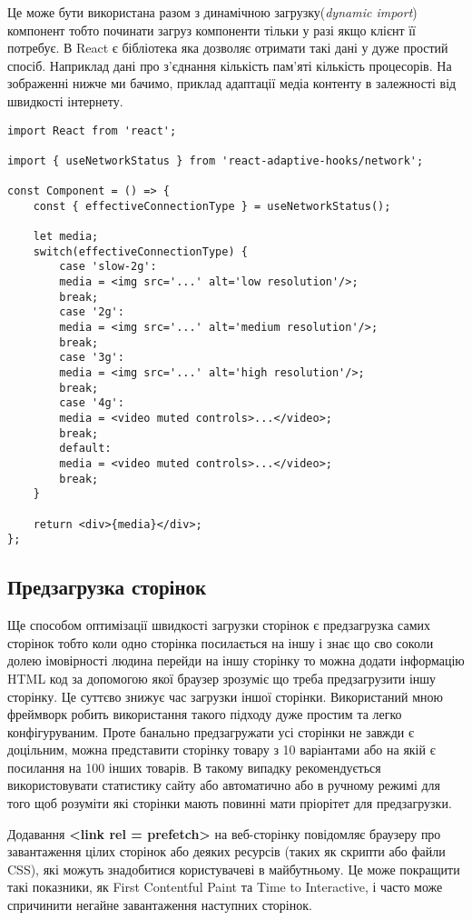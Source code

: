 Це може бути використана разом з динамічною загрузку(\textit{dynamic import}) компонент тобто починати загруз компоненти тільки у разі якщо клієнт її потребує.
В React є бібліотека яка дозволяє отримати такі дані у дуже простий спосіб.
Наприклад дані про з'єднання кількість пам'яті кількість процесорів.
На зображенні нижче ми бачимо, приклад адаптації медіа контенту в залежності від швидкості інтернету.
\begin{lstlisting}[basicstyle=\small]
import React from 'react';

import { useNetworkStatus } from 'react-adaptive-hooks/network';

const Component = () => {
    const { effectiveConnectionType } = useNetworkStatus();

    let media;
    switch(effectiveConnectionType) {
        case 'slow-2g':
        media = <img src='...' alt='low resolution'/>;
        break;
        case '2g':
        media = <img src='...' alt='medium resolution'/>;
        break;
        case '3g':
        media = <img src='...' alt='high resolution'/>;
        break;
        case '4g':
        media = <video muted controls>...</video>;
        break;
        default:
        media = <video muted controls>...</video>;
        break;
    }

    return <div>{media}</div>;
};

\end{lstlisting}
\subsection{Предзагрузка сторінок}
Ще способом оптимізації швидкості загрузки сторінок є предзагрузка самих сторінок тобто коли одно сторінка посилається на іншу
і знає що сво соколи долею імовірності людина перейди на іншу сторінку то можна додати інформацію HTML код за допомогою якої
браузер зрозуміє що треба предзагрузити іншу сторінку. Це суттєво знижує час загрузки іншої сторінки.
Використаний мною фреймворк робить використання такого підходу дуже простим та легко конфігуруваним.
Проте банально предзагружати усі сторінки не завжди є доцільним, можна представити сторінку товару з 10 варіантами
або на якій є посилання на 100 інших товарів.
В такому випадку рекомендується використовувати статистику сайту або автоматично або в ручному режимі для того щоб
розуміти які сторінки мають повинні мати пріорітет для предзагрузки.

Додавання \textbf{<link rel = prefetch>} на веб-сторінку повідомляє браузеру про завантаження цілих сторінок
або деяких ресурсів (таких як скрипти або файли CSS), які можуть знадобитися користувачеві в майбутньому.
Це може покращити такі показники, як First Contentful Paint та Time to Interactive,
і часто може спричинити негайне завантаження наступних сторінок.

